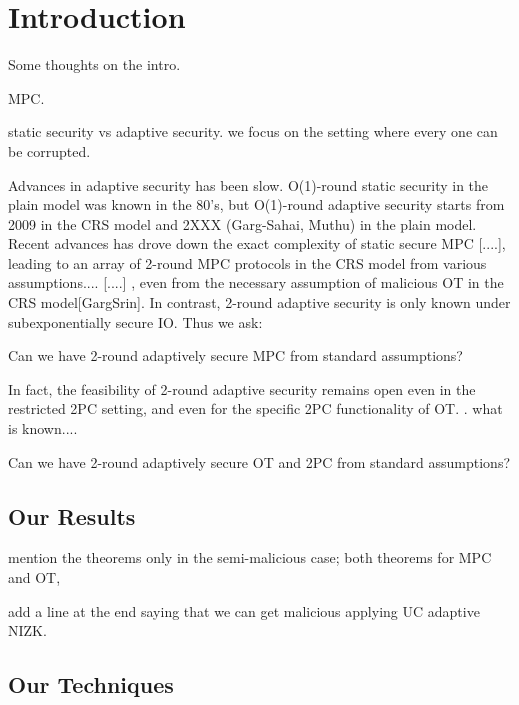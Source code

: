 
\section{Introduction}
\label{sec:intro}

Some thoughts on the intro. 

MPC. 

static security vs adaptive security. we focus on the setting where every one can be corrupted. 

Advances in adaptive security has been slow. O(1)-round static security in the plain model was known in the 80's, but O(1)-round adaptive security starts from 2009 in the CRS model and 2XXX (Garg-Sahai, Muthu) in the plain model. Recent advances has drove down the exact complexity of static secure MPC [....], leading to an array of 2-round MPC protocols in the CRS model from various assumptions.... [....] , even from the necessary assumption of malicious OT in the CRS model[GargSrin]. In contrast, 2-round adaptive security is only known under subexponentially secure IO. Thus we ask: 

Can we have 2-round adaptively secure MPC from standard assumptions? 

In fact, the feasibility of 2-round adaptive security remains open even in the restricted 2PC setting, and even for the specific 2PC functionality of OT. . what is known.... 

Can we have 2-round adaptively secure OT and 2PC from standard assumptions? 

 
\subsection{Our Results}
 
mention the theorems only in the semi-malicious case; both theorems for MPC and OT, 
 
add a line at the end saying that we can get malicious applying UC adaptive NIZK. 
 
\subsection{Our Techniques}

